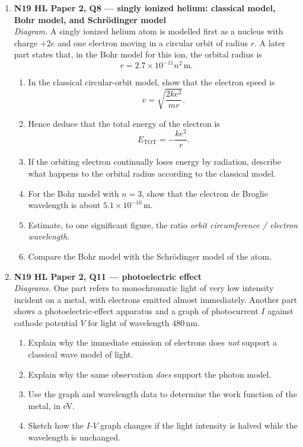 \documentclass[11pt]{article}
\begin{document}
\begin{enumerate}[leftmargin=*, itemsep=1.1em]
\item \textbf{N19 HL Paper 2, Q8 --- singly ionized helium: classical model, Bohr model, and Schr\"odinger model}\\
\textit{Diagram.} A singly ionized helium atom is modelled first as a nucleus with charge $+2e$ and one electron moving in a circular orbit of radius $r$. A later part states that, in the Bohr model for this ion, the orbital radius is
\[
r = 2.7\times10^{-11}n^{2}\,\text{m}.
\]
\begin{enumerate}[label=(\alph*)]
\item In the classical circular-orbit model, show that the electron speed is
\[
v=\sqrt{\frac{2ke^{2}}{mr}}.
\]
\item Hence deduce that the total energy of the electron is
\[
E_{\text{TOT}}=-\frac{ke^{2}}{r}.
\]
\item If the orbiting electron continually loses energy by radiation, describe what happens to the orbital radius according to the classical model.
\item For the Bohr model with $n=3$, show that the electron de Broglie wavelength is about $5.1\times10^{-10}\,\text{m}$.
\item Estimate, to one significant figure, the ratio \emph{orbit circumference / electron wavelength}.
\item Compare the Bohr model with the Schr\"odinger model of the atom.
\end{enumerate}

\item \textbf{N19 HL Paper 2, Q11 --- photoelectric effect}\\
\textit{Diagrams.} One part refers to monochromatic light of very low intensity incident on a metal, with electrons emitted almost immediately. Another part shows a photoelectric-effect apparatus and a graph of photocurrent $I$ against cathode potential $V$ for light of wavelength $480\,\text{nm}$.
\begin{enumerate}[label=(\alph*)]
\item Explain why the immediate emission of electrons does \emph{not} support a classical wave model of light.
\item Explain why the same observation \emph{does} support the photon model.
\item Use the graph and wavelength data to determine the work function of the metal, in eV.
\item Sketch how the $I$-$V$ graph changes if the light intensity is halved while the wavelength is unchanged.
\end{enumerate}


\end{enumerate}
\end{document}
